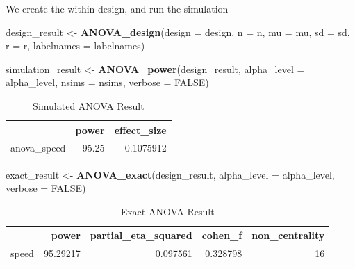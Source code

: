 \documentclass[]{book}
\newenvironment{Shaded}{\begin{snugshade}}{\end{snugshade}}
\newcommand{\DataTypeTok}[1]{\textcolor[rgb]{0.13,0.29,0.53}{#1}}
\newcommand{\KeywordTok}[1]{\textcolor[rgb]{0.13,0.29,0.53}{\textbf{#1}}}
\newcommand{\NormalTok}[1]{#1}
\newcommand{\OtherTok}[1]{\textcolor[rgb]{0.56,0.35,0.01}{#1}}
\newcommand{\StringTok}[1]{\textcolor[rgb]{0.31,0.60,0.02}{#1}}
\begin{document}
We create the within design, and run the simulation

\begin{Shaded}
\begin{Highlighting}[]
\NormalTok{design_result <-}\StringTok{ }\KeywordTok{ANOVA_design}\NormalTok{(}\DataTypeTok{design =}\NormalTok{ design,}
                   \DataTypeTok{n =}\NormalTok{ n, }
                   \DataTypeTok{mu =}\NormalTok{ mu, }
                   \DataTypeTok{sd =}\NormalTok{ sd, }
                   \DataTypeTok{r =}\NormalTok{ r, }
                   \DataTypeTok{labelnames =}\NormalTok{ labelnames)}
\end{Highlighting}
\end{Shaded}

\begin{Shaded}
\begin{Highlighting}[]
\NormalTok{simulation_result <-}\StringTok{ }\KeywordTok{ANOVA_power}\NormalTok{(design_result, }
                                 \DataTypeTok{alpha_level =}\NormalTok{ alpha_level, }
                                 \DataTypeTok{nsims =}\NormalTok{ nsims,}
                                 \DataTypeTok{verbose =} \OtherTok{FALSE}\NormalTok{)}
\end{Highlighting}
\end{Shaded}

\begin{table}[!h]

\caption{\label{tab:unnamed-chunk-122}Simulated ANOVA Result}
\centering
\begin{tabular}{l|r|r}
\hline
  & power & effect\_size\\
\hline
anova\_speed & 95.25 & 0.1075912\\
\hline
\end{tabular}
\end{table}

\begin{Shaded}
\begin{Highlighting}[]
\NormalTok{exact_result <-}\StringTok{ }\KeywordTok{ANOVA_exact}\NormalTok{(design_result,}
                            \DataTypeTok{alpha_level =}\NormalTok{ alpha_level,}
                            \DataTypeTok{verbose =} \OtherTok{FALSE}\NormalTok{)}
\end{Highlighting}
\end{Shaded}

\begin{table}[!h]

\caption{\label{tab:unnamed-chunk-124}Exact ANOVA Result}
\centering
\begin{tabular}{l|r|r|r|r}
\hline
  & power & partial\_eta\_squared & cohen\_f & non\_centrality\\
\hline
speed & 95.29217 & 0.097561 & 0.328798 & 16\\
\hline
\end{tabular}
\end{table}
\end{document}
